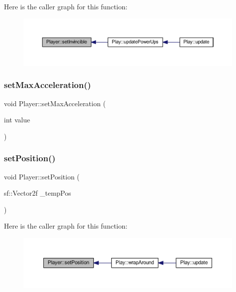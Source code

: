 Here is the caller graph for this function\+:
\nopagebreak
\begin{figure}[H]
\begin{center}
\leavevmode
\includegraphics[width=350pt]{class_player_a796610d4bf49196f261a82f5b2c0a044_icgraph}
\end{center}
\end{figure}
\mbox{\label{class_player_a0a644b2b50d659f6bd21dadefd6c5f14}} 
\subsubsection{\texorpdfstring{set\+Max\+Acceleration()}{setMaxAcceleration()}}
{\footnotesize\ttfamily void Player\+::set\+Max\+Acceleration (\begin{DoxyParamCaption}\item[{int}]{value }\end{DoxyParamCaption})}

\mbox{\label{class_player_aa37cc22b7a4862357cc70ae8f1f87396}} 
\subsubsection{\texorpdfstring{set\+Position()}{setPosition()}}
{\footnotesize\ttfamily void Player\+::set\+Position (\begin{DoxyParamCaption}\item[{sf\+::\+Vector2f}]{\+\_\+temp\+Pos }\end{DoxyParamCaption})}

Here is the caller graph for this function\+:
\nopagebreak
\begin{figure}[H]
\begin{center}
\leavevmode
\includegraphics[width=350pt]{class_player_aa37cc22b7a4862357cc70ae8f1f87396_icgraph}
\end{center}
\end{figure}
\mbox{\label{class_player_a6258e03705f093472c49af6d909fdad1}} 
